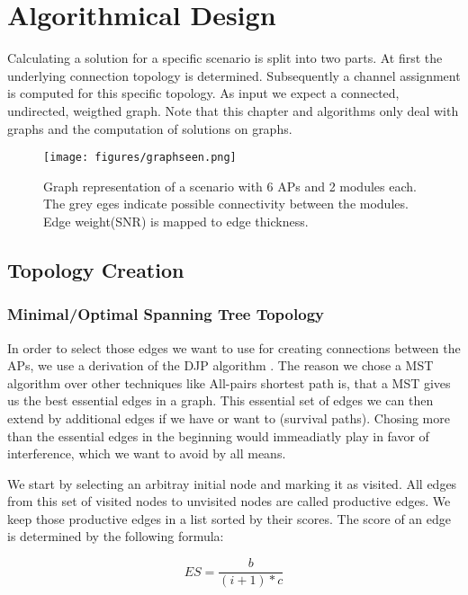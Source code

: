 \chapter{Algorithmical Design}
  Calculating a solution for a specific scenario is split into two parts. At first the underlying connection topology is determined.
  Subsequently a channel assignment is computed for this specific topology. As input we expect a connected, undirected, weigthed graph.
  Note that this chapter and algorithms only deal with graphs and the computation of solutions on graphs.
  
  \begin{figure}[htbp]
    \centering
    \texttt{[image: figures/graphseen.png]}
    \caption{Graph representation of a scenario with 6 APs and 2 modules each. The grey eges indicate possible connectivity between the 
      modules. Edge weight(SNR) is mapped to edge thickness.}
    \label{fig:graphseen}
  \end{figure}
  
  \section{Topology Creation}

    \subsection{Minimal/Optimal Spanning Tree Topology}
      In order to select those edges we want to use for creating connections between the APs, we use a derivation of the \ac{DJP} algorithm \cite{prim}\cite{jarnik}.
      The reason we chose a \ac{MST} algorithm over other techniques like All-pairs shortest path is, that a MST gives us the best essential edges in a graph. 
      This essential set of edges we can then extend by additional edges if we have or want to (survival paths). 
      Chosing more than the essential edges in the beginning would immeadiatly play in favor of interference, which we want to avoid by all means.      
      
      We start by selecting an arbitray initial node and marking it as visited. All edges from this set of visited nodes to unvisited nodes are called productive edges.
      We keep those productive edges in a list sorted by their scores. The score of an edge is determined by the following formula:
      
      \begin{equation} \label{eq:edgescore}
	ES=\frac{b}{(i + 1 )* c}
      \end{equation}
      
